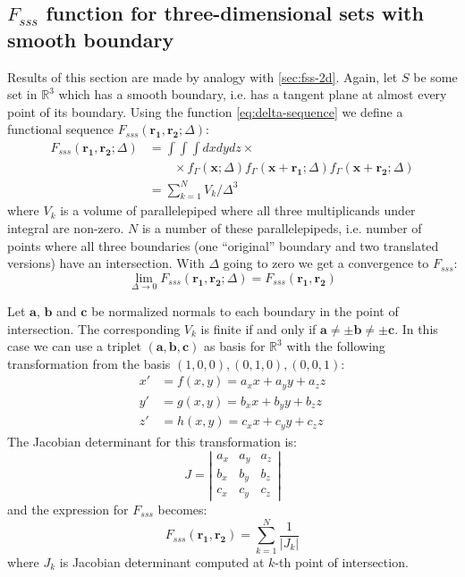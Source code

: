 \documentclass[preprint]{elsarticle}
\begin{document}
\subsection{$F_{sss}$ function for three-dimensional sets with smooth boundary}
\label{sec:fsss-3d}
Results of this section are made by analogy with \cref{sec:fss-2d}. Again, let
$S$ be some set in $\mathbb{R}^3$ which has a smooth boundary, i.e. has a
tangent plane at almost every point of its boundary. Using the function
\cref{eq:delta-sequence} we define a functional sequence
$F_{sss}(\bm{r_1}, \bm{r_2}; \Delta)$:
\begin{equation}
  \begin{aligned}
    F_{sss}(\bm{r_1}, \bm{r_2}; \Delta) &= \int\int\int dx dy dz \times \\
    &\qquad \times f_\Gamma(\bm{x}; \Delta) f_\Gamma(\bm{x} + \bm{r_1}; \Delta)
    f_\Gamma(\bm{x} + \bm{r_2}; \Delta) \\
    &= \sum_{k=1}^N V_k/\Delta^3
  \end{aligned}
\end{equation}
where $V_k$ is a volume of parallelepiped where all three multiplicands under
integral are non-zero. $N$ is a number of these parallelepipeds, i.e. number of
points where all three boundaries (one ``original'' boundary and two translated
versions) have an intersection. With $\Delta$ going to zero we get a convergence
to $F_{sss}$:
\begin{equation}
  \lim_{\Delta \to 0} F_{sss}(\bm{r_1}, \bm{r_2}; \Delta) = F_{sss}(\bm{r_1},
  \bm{r_2})
\end{equation}

Let $\bm{a}$, $\bm{b}$ and $\bm{c}$ be normalized normals to each boundary in
the point of intersection. The corresponding $V_k$ is finite if and only if
$\bm{a} \ne \pm \bm{b} \ne \pm \bm{c}$. In this case we can use a triplet
$(\bm{a}, \bm{b}, \bm{c})$ as basis for $\mathbb{R}^3$ with the following
transformation from the basis $(1,0,0), (0,1,0), (0, 0, 1)$:
\begin{equation}
  \begin{aligned}
    x' &= f(x, y) = a_x x + a_y y + a_z z \\
    y' &= g(x, y) = b_x x + b_y y + b_z z \\
    z' &= h(x, y) = c_x x + c_y y + c_z z
  \end{aligned}
\end{equation}
The Jacobian determinant for this transformation is:
\begin{equation}
  J = \left|
  \begin{array}{ccc}
    a_x & a_y & a_z \\
    b_x & b_y & b_z \\
    c_x & c_y & c_z
  \end{array}
  \right|
\end{equation}
and the expression for $F_{sss}$ becomes:
\begin{equation}
  F_{sss}(\bm{r_1}, \bm{r_2}) = \sum_{k=1}^N \frac{1}{|J_k|} \label{eq:fsss-3d}
\end{equation}
where $J_k$ is Jacobian determinant computed at $k$-th point of
intersection.
\end{document}
